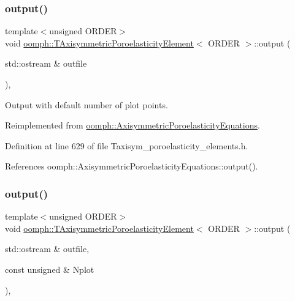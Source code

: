 \subsubsection{\texorpdfstring{output()}{output()}\hspace{0.1cm}{\footnotesize\ttfamily [1/2]}}
{\footnotesize\ttfamily template$<$unsigned O\+R\+D\+ER$>$ \\
void \hyperlink{classoomph_1_1TAxisymmetricPoroelasticityElement}{oomph\+::\+T\+Axisymmetric\+Poroelasticity\+Element}$<$ O\+R\+D\+ER $>$\+::output (\begin{DoxyParamCaption}\item[{std\+::ostream \&}]{outfile }\end{DoxyParamCaption})\hspace{0.3cm}{\ttfamily [inline]}, {\ttfamily [virtual]}}



Output with default number of plot points. 



Reimplemented from \hyperlink{classoomph_1_1AxisymmetricPoroelasticityEquations_afb277eef2c340f6fa432eefa415aedf7}{oomph\+::\+Axisymmetric\+Poroelasticity\+Equations}.



Definition at line 629 of file Taxisym\+\_\+poroelasticity\+\_\+elements.\+h.



References oomph\+::\+Axisymmetric\+Poroelasticity\+Equations\+::output().

\mbox{\label{classoomph_1_1TAxisymmetricPoroelasticityElement_a8a9f71d4757ccb3c1a172f080e2731ca}} 
\subsubsection{\texorpdfstring{output()}{output()}\hspace{0.1cm}{\footnotesize\ttfamily [2/2]}}
{\footnotesize\ttfamily template$<$unsigned O\+R\+D\+ER$>$ \\
void \hyperlink{classoomph_1_1TAxisymmetricPoroelasticityElement}{oomph\+::\+T\+Axisymmetric\+Poroelasticity\+Element}$<$ O\+R\+D\+ER $>$\+::output (\begin{DoxyParamCaption}\item[{std\+::ostream \&}]{outfile,  }\item[{const unsigned \&}]{Nplot }\end{DoxyParamCaption})\hspace{0.3cm}{\ttfamily [inline]}, {\ttfamily [virtual]}}



